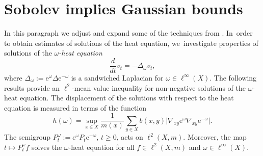 \documentclass[JEP,XML,SOM,Unicode,published]{cedram}
\theoremstyle{plain}
\theoremstyle{definition}
\newcommand{\euler}{\mathrm{e}}
\begin{document}
\section{Sobolev implies Gaussian bounds}\label{section:SG}

In this paragraph we adjust and expand some of the techniques from \cite{KellerRose-22a}. In~order to obtain estimates of solutions of the heat equation, we~investigate properties of solutions of the \emph{$\omega$-heat equation}
\[
\frac{d}{dt} v_t= -\Delta_\omega v_t,
\]
where $\Delta_\omega:= \euler^\omega\Delta \euler^{-\omega}$ is a sandwiched Laplacian for $\omega\in\ell^\infty(X)$.
The following results provide an $\ell^2$-mean value inequality for non-negative solutions of the $\omega$-heat equation. The displacement of the solutions with respect to the heat equation is measured in terms of the function
\[
h(\omega)=\sup_{x\in X}\frac{1}{m(x)}\sum_{y\in X} b(x,y)\vert \nabla_{xy}\euler^\omega\nabla_{xy}\euler^{-\omega}\vert.
\]
The semigroup $P_t^\omega:=\euler^\omega P_t\euler^{-\omega}$, $ t\ge0 $, acts on $\ell^2(X,m)$. Moreover, the map $t\mapsto P_t^\omega f$ solves the $\omega$-heat equation for all $f\in\ell^2(X,m)$ and $\omega\in\ell^\infty(X)$.
\end{document}
